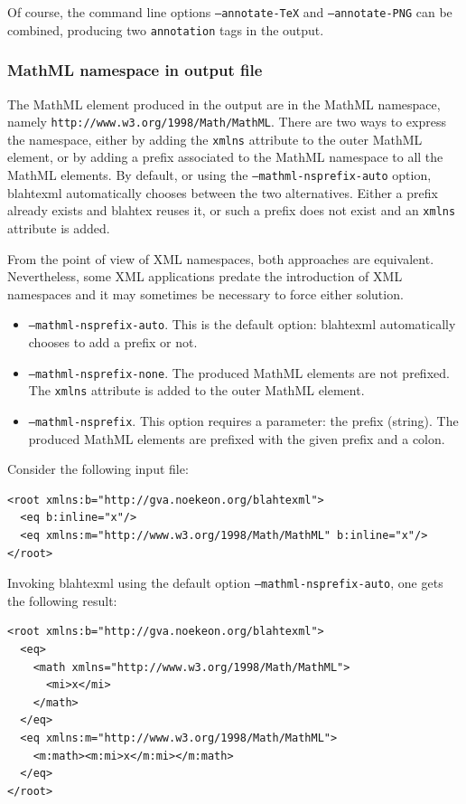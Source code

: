 \documentclass{article}
\begin{document}
Of course, the command line options \texttt{--annotate-TeX} and \texttt{--annotate-PNG} can be combined, producing two \texttt{annotation} tags in the output.

\subsubsection{MathML namespace in output file}

The MathML element produced in the output are in the MathML namespace, namely \texttt{http://www.w3.org/1998/Math/MathML}. There are two ways to express the namespace, either by adding the \texttt{xmlns} attribute to the outer MathML element, or by adding a prefix associated to the MathML namespace to all the MathML elements. By default, or using the \texttt{--mathml-nsprefix-auto} option, blahtexml automatically chooses between the two alternatives. Either a prefix already exists and blahtex reuses it, or such a prefix does not exist and an \texttt{xmlns} attribute is added.

From the point of view of XML namespaces, both approaches are equivalent. Nevertheless, some XML applications predate the introduction of XML namespaces and it may sometimes be necessary to force either solution.

\begin{itemize}
\item \texttt{--mathml-nsprefix-auto}. This is the default option: blahtexml automatically chooses to add a prefix or not.
\item \texttt{--mathml-nsprefix-none}. The produced MathML elements are not prefixed. The \texttt{xmlns} attribute is added to the outer MathML element.
\item \texttt{--mathml-nsprefix}. This option requires a parameter: the prefix (string). The produced MathML elements are prefixed with the given prefix and a colon.
\end{itemize}

Consider the following input file:
\begin{verbatim}
<root xmlns:b="http://gva.noekeon.org/blahtexml">
  <eq b:inline="x"/>
  <eq xmlns:m="http://www.w3.org/1998/Math/MathML" b:inline="x"/>
</root>
\end{verbatim}

Invoking blahtexml using the default option \texttt{--mathml-nsprefix-auto}, one gets the following result:
\begin{verbatim}
<root xmlns:b="http://gva.noekeon.org/blahtexml">
  <eq>
    <math xmlns="http://www.w3.org/1998/Math/MathML">
      <mi>x</mi>
    </math>
  </eq>
  <eq xmlns:m="http://www.w3.org/1998/Math/MathML">
    <m:math><m:mi>x</m:mi></m:math>
  </eq>
</root>
\end{verbatim}
\end{document}
